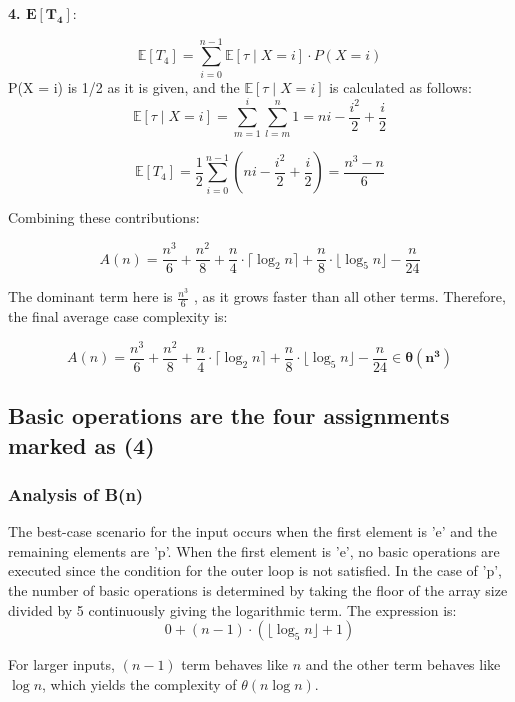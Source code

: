 \documentclass[11pt, oneside, a4paper]{article}
\begin{document}
\textbf{4. $\mathbf{E[T_4]}$}:

\[
\mathbb{E}[T_4] = \sum_{i=0}^{n-1} \mathbb{E}[\tau \mid X=i] \cdot P(X=i)
\]
P(X = i) is 1/2 as it is given, and the $\mathbb{E}[\tau \mid X=i]$ is calculated as follows:
\[
\mathbb{E}[\tau \mid X=i] = \sum_{m=1}^{i} \sum_{l=m}^{n} 1 = ni - \frac{i^2}{2} + \frac{i}{2} 
\]

\[
\mathbb{E}[T_4] = \frac{1}{2} \sum_{i=0}^{n-1} (ni - \frac{i^2}{2} + \frac{i}{2}) = \frac{n^3 - n}{6}
\]

Combining these contributions:

\begin{equation*}
A(n) = \frac{n^3}{6} + \frac{n^2}{8} + \frac{n}{4} \cdot \lceil \log_2 n \rceil + \frac{n}{8} \cdot \lfloor \log_5 n \rfloor  - \frac{n}{24}
\end{equation*}


The dominant term here is \( \frac{n^3}{6}\) , as it grows faster than all other terms. Therefore, the final average case complexity is:

\[
A(n) = \frac{n^3}{6} + \frac{n^2}{8} + \frac{n}{4} \cdot \lceil \log_2 n \rceil + \frac{n}{8} \cdot \lfloor \log_5 n \rfloor  - \frac{n}{24} \in \boldsymbol{\theta(n^3)}
\]




	\subsection{Basic operations are the four assignments marked as (4)}

\subsubsection{Analysis of B(n)}

The best-case scenario for the input occurs when the first element is 'e' and the remaining elements are 'p'. When the first element is 'e', no basic operations are executed since the condition for the outer loop is not satisfied. In the case of 'p', the number of basic operations is determined by taking the floor of the array size divided by 5 continuously giving the logarithmic term. The expression is:
\begin{equation*}
0 + (n-1) \cdot \left( \lfloor \log_5 n \rfloor + 1 \right)
\end{equation*}

For larger inputs, \( (n-1) \) term behaves like \( n \) and the other term behaves like \( \log n \), which yields the complexity of \( \theta(n \log n) \).
\end{document}
